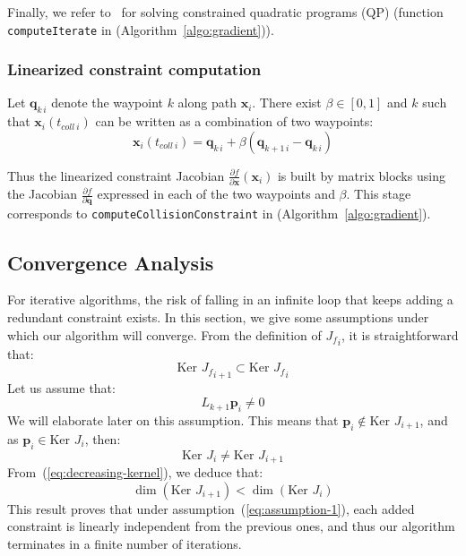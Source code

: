 \documentclass{tADR2e}
\newcommand\p{\mathbf{p}}
\newcommand\pii{\mathbf{p_{i,i+1}}}
\newcommand\conf{\mathbf{q}}
\newcommand\xx{\mathbf{x}} %
\newcommand\tcolli{t_{coll\ i}}
\newcommand\Jf{{J_f}}
\newcommand\kernel{\mbox{Ker }}
\begin{document}
\vspace{0.4cm}

Finally, we refer to~\cite{nocedal2006numerical} for solving constrained quadratic 
programs (QP) (function \texttt{computeIterate} in 
(Algorithm~\ref{algo:gradient})).


\vspace{0.2cm}

\subsubsection{Linearized constraint computation} \label{sec:lin_constr_compt}

Let $\conf_{k\,i}$ denote the waypoint $k$ along path $\xx_i$.
There exist $\beta\in[0,1]$ and $k$ such that $\xx_i (\tcolli)$ can be written as a combination of two waypoints:
$$
\xx_i (\tcolli) = \conf_{k\,i} + \beta (\conf_{k+1\,i} - \conf_{k\,i})
$$

Thus the linearized constraint Jacobian $\frac{\partial f}{\partial \xx}(\xx_i)$ 
is built by matrix 
blocks using the Jacobian $\frac{\partial f}{\partial \conf}$ expressed in each of the two waypoints
and $\beta$. This stage corresponds to \texttt{computeCollisionConstraint} in 
(Algorithm~\ref{algo:gradient}).


\subsection{Convergence Analysis}
For iterative algorithms, the risk of falling in an infinite loop 
that keeps adding a redundant constraint exists.
In this section, we give some assumptions under which our 
algorithm will converge.
From the definition of $\Jf_{i}$, it is straightforward that:
\begin{equation}\label{eq:decreasing-kernel}
\kernel \Jf_{i+1} \subset \kernel \Jf_{i}
\end{equation}
Let us assume that:
\begin{equation}\label{eq:assumption-1}
L_{k+1}\p_i \not= 0
\end{equation}
We will elaborate later on this assumption. This means that $\p_{i}\notin\kernel J_{i+1}$, and as $\p_{i}\in\kernel J_{i}$, then:
$$
\kernel J_i \not= \kernel J_{i+1}
$$
From~(\ref{eq:decreasing-kernel}), we deduce that:
$$
\dim (\kernel J_{i+1}) < \dim (\kernel J_i)
$$
This result proves that under assumption~(\ref{eq:assumption-1}), each added constraint 
is linearly independent from the 
previous ones, and thus our algorithm terminates in a finite number of iterations.
\end{document}

